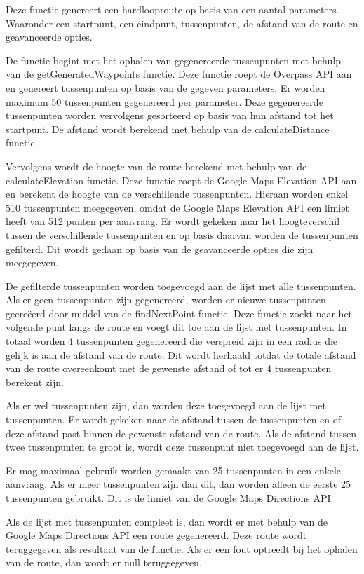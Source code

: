 Deze functie genereert een hardlooproute op basis van een aantal parameters. Waaronder een startpunt, een eindpunt, tussenpunten, de afstand van de route en geavanceerde opties.

\vspace{1cm}

De functie begint met het ophalen van gegenereerde tussenpunten met behulp van de getGeneratedWaypoints functie. Deze functie roept de Overpass API aan en genereert tussenpunten op basis van de gegeven parameters.
Er worden maximum 50 tussenpunten gegenereerd per parameter.
Deze gegenereerde tussenpunten worden vervolgens gesorteerd op basis van hun afstand tot het startpunt. De afstand wordt berekend met behulp van de calculateDistance functie.

\vspace{1cm}

Vervolgens wordt de hoogte van de route berekend met behulp van de calculateElevation functie. Deze functie roept de Google Maps Elevation API aan en berekent de hoogte van de verschillende tussenpunten. 
Hieraan worden enkel 510 tussenpunten meegegeven, omdat de Google Maps Elevation API een limiet heeft van 512 punten per aanvraag.
Er wordt gekeken naar het hoogteverschil tussen de verschillende tussenpunten en op basis daarvan worden de tussenpunten gefilterd. Dit wordt gedaan op basis van de geavanceerde opties die zijn meegegeven.

\vspace{1cm}

De gefilterde tussenpunten worden toegevoegd aan de lijst met alle tussenpunten. Als er geen tussenpunten zijn gegenereerd, worden er nieuwe tussenpunten gecreëerd door middel van de findNextPoint functie. 
Deze functie zoekt naar het volgende punt langs de route en voegt dit toe aan de lijst met tussenpunten. In totaal worden 4 tussenpunten gegenereerd die verspreid zijn in een radius die gelijk is aan de afstand van de route.
Dit wordt herhaald totdat de totale afstand van de route overeenkomt met de gewenste afstand of tot er 4 tussenpunten berekent zijn.

\vspace{1cm}

Als er wel tussenpunten zijn, dan worden deze toegevoegd aan de lijst met tussenpunten. Er wordt gekeken naar de afstand tussen de tussenpunten en of deze afstand past binnen de gewenste afstand van de route. 
Als de afstand tussen twee tussenpunten te groot is, wordt deze tussenpunt niet toegevoegd aan de lijst.

\vspace{1cm}

Er mag maximaal gebruik worden gemaakt van 25 tussenpunten in een enkele aanvraag. Als er meer tussenpunten zijn dan dit, dan worden alleen de eerste 25 tussenpunten gebruikt.
Dit is de limiet van de Google Maps Directions API.

\vspace{1cm}

Als de lijst met tussenpunten compleet is, dan wordt er met behulp van de Google Maps Directions API een route gegenereerd. 
Deze route wordt teruggegeven als resultaat van de functie. Als er een fout optreedt bij het ophalen van de route, dan wordt er null teruggegeven.